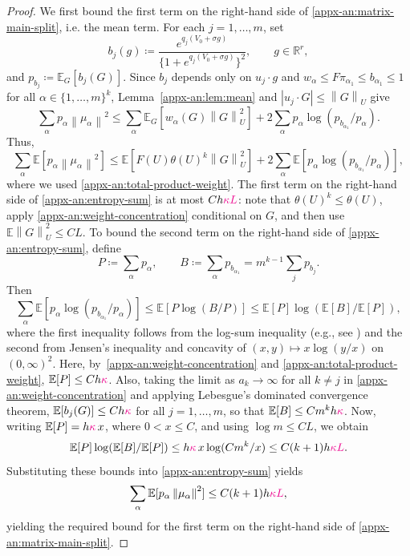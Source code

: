 \documentclass[11pt,letterpaper]{article}
\newcommand{\vSix}[1]{{\color{magenta}#1}}
\theoremstyle{remark}
\newcommand{\E}{\mathbb E}
\newcommand{\R}{\mathbb R}
\newcommand{\norm}[1]{\left\lVert#1\right\rVert}
\begin{document}
\begin{proof}
We first bound the first term on the right-hand side of \eqref{appx-an:matrix-main-split}, i.e. the mean term.
For each $j=1,\dots, m$, set
\[
 b_j(g)\coloneqq
 \frac{e^{q_j(V_0+\sigma g)}}
 {\{1+e^{q_j(V_0+\sigma g)}\}^2},
 \qquad g\in\R^r,
 \]
 and \(p_{b_j}\coloneqq\E_G[b_j(G)]\).
Since $b_j$ depends only on $u_j\cdot g$ and
$w_\alpha\le F\pi_{\alpha_1}\le b_{\alpha_1}\leq 1$ for all $\alpha\in\{1,\dots, m\}^k$,
Lemma~\ref{appx-an:lem:mean} and
$|u_j\cdot G|\le\norm G_U$ give
\[
 \sum_\alpha p_\alpha\norm{\mu_\alpha}^2
 \le \sum_{\alpha}\E_G[w_{\alpha}(G)\norm G_U^2]
 +2\sum_\alpha p_\alpha
 \log(p_{b_{\alpha_1}}/p_\alpha).
\] 
Thus,
\begin{equation}
\sum_\alpha \E[p_\alpha\norm{\mu_\alpha}^2]
 \le \E[F(U)\theta(U)^k\norm G_U^2]
 +2\sum_\alpha \E[p_\alpha
 \log(p_{b_{\alpha_1}}/p_\alpha)],
 \label{appx-an:entropy-sum}
\end{equation}
where we used \eqref{appx-an:total-product-weight}.  The first term on the right-hand side of \eqref{appx-an:entropy-sum} is at most
$Ch\vSix{\kappa L}$: note that $\theta(U)^k \leq \theta(U)$, apply
\eqref{appx-an:weight-concentration} conditional on $G$, and then use $\E\norm G_U^2\le CL$.
To bound the second term on the right-hand side of \eqref{appx-an:entropy-sum}, 
define
\[
 P\coloneqq\sum_\alpha p_\alpha,\qquad
 B\coloneqq\sum_\alpha p_{b_{\alpha_1}}
 =m^{k-1}\sum_j p_{b_j}.
\]
Then
\[
 \sum_\alpha \E [p_\alpha
 \log(p_{b_{\alpha_1}}/p_\alpha)]
 \le \E[P\log(B/P)]
 \le \E[P]\log(\E[B]/\E[P]),
\]
where the first inequality follows from the log-sum inequality (e.g., see \cite[Theorem~2.7.1]{CoverThomas2006}) and the second from Jensen's inequality and concavity of $(x,y)\mapsto x\log(y/x)$ on $(0,\infty)^2$.
Here, by~\eqref{appx-an:weight-concentration} and \eqref{appx-an:total-product-weight}, $\E[P] \le Ch\vSix{\kappa}$. Also, taking the limit as $a_k\to\infty$ for all $k\neq j$ in \eqref{appx-an:weight-concentration} and applying Lebesgue's dominated convergence theorem, $\E[b_j(G)] \leq Ch\vSix{\kappa}$ for all $j=1,\dots, m$, so that  $\E[B] \le Cm^kh\vSix{\kappa}$.
Now, writing $\E[P] =h\vSix{\kappa}\,x$, where $0<x\le C$,
and using $\log m\le CL$, we obtain
\[
 \E[P]\log(\E[B]/\E[P])
 \le h\vSix{\kappa}\,x\log(Cm^k/x)
 \le C(k+1)h\vSix{\kappa L}.
\]
Substituting these bounds into \eqref{appx-an:entropy-sum} yields
\begin{equation}
  \sum_\alpha \E[p_\alpha\norm{\mu_\alpha}^2]
 \le C(k+1)h\vSix{\kappa L},
 \label{appx-an:tilted-mean-bound}
\end{equation}
yielding the required bound for the first term on the right-hand side of \eqref{appx-an:matrix-main-split}.


\end{proof}
\end{document}
